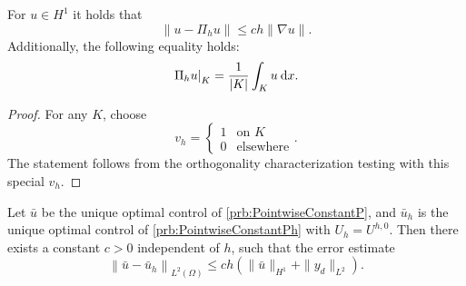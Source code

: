 \documentclass[../skript.tex]{subfiles}
\begin{document}
For $u \in H^1$ it holds that
\[
	\| u - \Pi_h u \| \leq ch \| \nabla u \|.
\]
Additionally, the following equality holds:
\[
	\left. \Pi_h u \right|_K = \frac{1}{|K|} \int_K u \:\mathrm{d}x.
\]
\begin{proof}
For any $K$, choose
\[
	v_h = \begin{cases}
	1 & \text{on } K\\
	0 & \text{elsewhere}
	\end{cases}.
\]
The statement follows from the orthogonality characterization testing with this special $v_h$.
\end{proof}
\begin{theorem}
Let $\bar{u}$ be the unique optimal control of \cref{prb:PointwiseConstantP}, and $\bar{u}_h$ is the unique optimal control of \cref{prb:PointwiseConstantPh} with $U_h = U^{h, 0}$.
Then there exists a constant $c > 0$ independent of $h$, such that the error estimate
\[
	\left\| \bar{u} - \bar{u}_h \right\|_{L^2(\Omega)} \leq ch \left( \| \bar{u} \|_{H^1} + \| y_d \|_{L^2} \right).
\]
\end{theorem}
\end{document}
